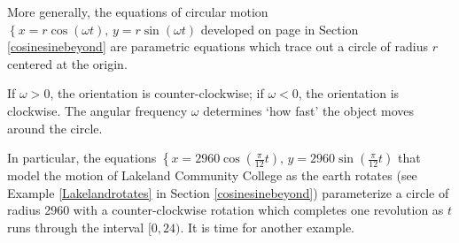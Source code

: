 \documentclass{ximera}
\begin{document}
   
  
  More generally, the equations of circular motion $\left\{ x = r\cos(\omega t), \, y = r\sin(\omega t) \right.$ developed on page \pageref{equationsforcircularmotion} in Section \ref{cosinesinebeyond} are parametric equations which trace out a circle of radius $r$ centered at the origin. 
  
   
  
   If $\omega > 0$, the orientation is counter-clockwise;  if $\omega < 0$, the orientation is clockwise.  The angular frequency $\omega$ determines `how fast' the object moves around the circle. 
   
    
   
   In particular, the equations  $\left\{ x = 2960 \cos\left(\frac{\pi}{12} t\right), \, y  = 2960 \sin\left(\frac{\pi}{12} t\right) \right.$ that model the motion of Lakeland Community College as the earth rotates (see Example \ref{Lakelandrotates} in Section \ref{cosinesinebeyond}) parameterize a circle of radius 2960 with a counter-clockwise rotation which completes one revolution as $t$ runs through the interval $[0,24)$.  It is time for another example.
\end{document}
